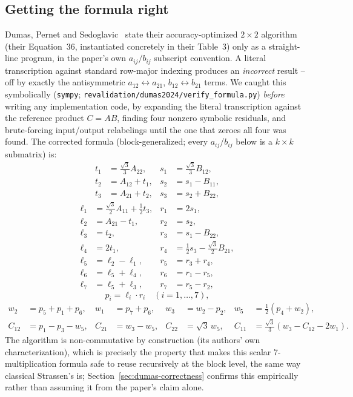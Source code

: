 \documentclass[acmsmall]{acmart}
\begin{document}
\subsection{Getting the formula right}
Dumas, Pernet and Sedoglavic~\cite{dumas2024strassen} state their
accuracy-optimized $2\times2$ algorithm (their Equation~36, instantiated
concretely in their Table~3) only as a straight-line program, in the
paper's own $a_{ij}/b_{ij}$ subscript convention. A literal transcription
against standard row-major indexing produces an \emph{incorrect} result
-- off by exactly the antisymmetric $a_{12}\leftrightarrow a_{21}$,
$b_{12}\leftrightarrow b_{21}$ terms. We caught this symbolically
(\texttt{sympy}; \texttt{revalidation/dumas2024/verify\_formula.py})
\emph{before} writing any implementation code, by expanding the literal
transcription against the reference product $C=AB$, finding four
nonzero symbolic residuals, and brute-forcing input/output relabelings
until the one that zeroes all four was found. The corrected formula
(block-generalized; every $a_{ij}$/$b_{ij}$ below is a $k\times k$
submatrix) is:
\begin{align*}
t_1 &= \tfrac{\sqrt3}{3} A_{22}, &
s_1 &= \tfrac{\sqrt3}{3} B_{12}, \\
t_2 &= A_{12} + t_1, &
s_2 &= s_1 - B_{11}, \\
t_3 &= A_{21} + t_2, &
s_3 &= s_2 + B_{22},
\end{align*}
\begin{align*}
\ell_1 &= \tfrac{\sqrt3}{2} A_{11} + \tfrac12 t_3, & r_1 &= 2 s_1, \\
\ell_2 &= A_{21} - t_1, & r_2 &= s_2, \\
\ell_3 &= t_2, & r_3 &= s_1 - B_{22}, \\
\ell_4 &= 2 t_1, & r_4 &= \tfrac12 s_3 - \tfrac{\sqrt3}{2} B_{21}, \\
\ell_5 &= \ell_2 - \ell_1, & r_5 &= r_3 + r_4, \\
\ell_6 &= \ell_5 + \ell_4, & r_6 &= r_1 - r_5, \\
\ell_7 &= \ell_5 + \ell_3, & r_7 &= r_5 - r_2,
\end{align*}
\[
p_i = \ell_i \cdot r_i \quad (i=1,\dots,7),
\]
\begin{align*}
w_2 &= p_5+p_1+p_6, & w_1 &= p_7+p_6, & w_3 &= w_2-p_2, & w_5 &= \tfrac12(p_4+w_2), \\
C_{12} &= p_1-p_3-w_5, & C_{21} &= w_3-w_5, & C_{22} &= \sqrt3\, w_5, &
C_{11} &= \tfrac{\sqrt3}{3}(w_3-C_{12}-2w_1).
\end{align*}
The algorithm is non-commutative by construction (its authors' own
characterization), which is precisely the property that makes this
scalar 7-multiplication formula safe to reuse recursively at the block
level, the same way classical Strassen's is; Section~\ref{sec:dumas-correctness}
confirms this empirically rather than assuming it from the paper's claim
alone.
\end{document}
